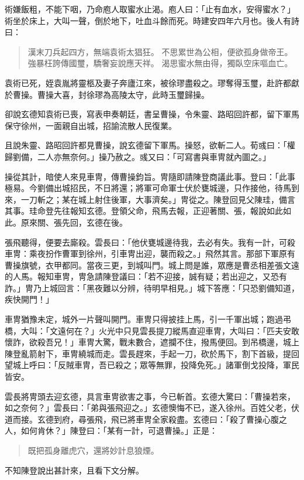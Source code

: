 術嫌飯粗，不能下咽，乃命庖人取蜜水止渴。庖人曰：「止有血水，安得蜜水？」術坐於床上，大叫一聲，倒於地下，吐血斗餘而死。時建安四年六月也。後人有詩曰：

\begin{quote}
漢末刀兵起四方，無端袁術太猖狂。
不思累世為公相，便欲孤身做帝王。
強暴枉誇傳國璽，驕奢妄說應天祥。
渴思蜜水無由得，獨臥空床嘔血亡。
\end{quote}

袁術已死，姪袁胤將靈柩及妻子奔廬江來，被徐璆盡殺之。璆奪得玉璽，赴許都獻於曹操。曹操大喜，封徐璆為高陵太守，此時玉璽歸操。

卻說玄德知袁術已喪，寫表申奏朝廷，書呈曹操，令朱靈、路昭回許都，留下軍馬保守徐州，一面親自出城，招諭流散人民復業。

且說朱靈、路昭回許都見曹操，說玄德留下軍馬。操怒，欲斬二人。荀彧曰：「權歸劉備，二人亦無奈何。」操乃赦之。彧又曰：「可寫書與車冑就內圖之。」

操從其計，暗使人來見車冑，傳曹操鈞旨。冑隨即請陳登商議此事。登曰：「此事極易。今劉備出城招民，不日將還；將軍可命軍士伏於甕城邊，只作接他，待馬到來，一刀斬之；某在城上射住後軍，大事濟矣。」冑從之。陳登回見父陳珪，備言其事。珪命登先往報知玄德。登領父命，飛馬去報，正迎著關、張，報說如此如此。原來關、張先回，玄德在後。

張飛聽得，便要去廝殺。雲長曰：「他伏甕城邊待我，去必有失。我有一計，可殺車冑：乘夜扮作曹軍到徐州，引車冑出迎，襲而殺之。」飛然其言。那部下軍原有曹操旗號，衣甲都同。當夜三更，到城叫門。城上問是誰，眾應是曹丞相差張文遠的人馬。報知車冑，冑急請陳登議曰：「若不迎接，誠有疑；若出迎之，又恐有詐。」冑乃上城回言：「黑夜難以分辨，待明早相見。」城下答應：「只恐劉備知道，疾快開門！」

車冑猶豫未定，城外一片聲叫開門。車冑只得披挂上馬，引一千軍出城；跑過弔橋，大叫：「文遠何在？」火光中只見雲長提刀縱馬直迎車冑，大叫曰：「匹夫安敢懷詐，欲殺吾兄！」車冑大驚，戰未數合，遮攔不住，撥馬便回。到吊橋邊，城上陳登亂箭射下，車冑繞城而走。雲長趕來，手起一刀，砍於馬下，割下首級，提回望城上呼曰：「反賊車冑，吾已殺之；眾等無罪，投降免死。」諸軍倒戈投降，軍民皆安。

雲長將冑頭去迎玄德，具言車冑欲害之事，今已斬首。玄德大驚曰：「曹操若來，如之奈何？」雲長曰：「弟與張飛迎之。」玄德懊悔不已，遂入徐州。百姓父老，伏道而接。玄德到府，尋張飛，飛已將車冑全家殺盡。玄德曰：「殺了曹操心腹之人，如何肯休？」陳登曰：「某有一計，可退曹操。」正是：

\begin{quote}
既把孤身離虎穴，還將妙計息狼煙。
\end{quote}

不知陳登說出甚計來，且看下文分解。
